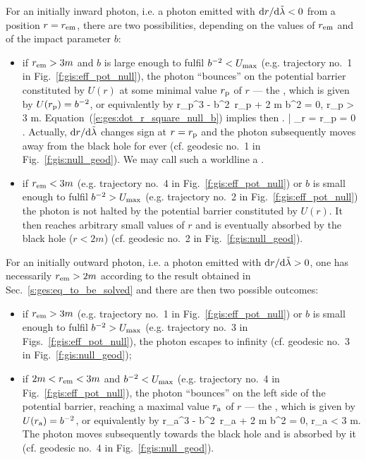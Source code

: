 For an initially inward photon, i.e. a photon emitted with ${\mathrm{d} r}/{\mathrm{d}\tilde{\lambda}} < 0$
from a position $r=r_{\rm em}$, there are
two possibilities, depending on the values of $r_{\rm em}$ and
of the impact parameter $b$:
\begin{itemize}
\item if $r_{\rm em} > 3 m$ and $b$ is large enough to fulfil $b^{-2} < U_{\rm max}$
(e.g. trajectory no.~1 in Fig.~\ref{f:gis:eff_pot_null}), the photon
``bounces'' on the potential barrier constituted by $U(r)$
at some minimal value  $r_{\rm p}$ of $r$ --- the ,
which is given by  $U(r_{\rm p}) = b^{-2}$, or equivalently by
\be \label{e:ges:r_per_null}
  r_{\rm p}^3 - b^2\, r_{\rm p} + 2 m b^2 = 0, \quad r_{\rm p} > 3 m.
\ee
Equation~(\ref{e:ges:dot_r_square_null_b})
implies then
\be
    \left.  \right| _{r = r_{\rm p}} = 0 .
\ee
Actually, $\mathrm{d} r / \mathrm{d}\tilde{\lambda}$ changes sign at $r = r_{\rm p}$ and
the photon subsequently moves away from the black hole for ever (cf. geodesic
no.~1 in Fig.~\ref{f:gis:null_geod}). We may call
such a worldline a .
\item if $r_{\rm em} < 3 m$ (e.g. trajectory
no.~4 in Fig.~\ref{f:gis:eff_pot_null}) or $b$ is small enough to fulfil $b^{-2} > U_{\rm max}$ (e.g. trajectory
no.~2 in Fig.~\ref{f:gis:eff_pot_null}) the photon
is not halted by the potential barrier constituted by $U(r)$. It then reaches arbitrary
small values of $r$ and is eventually absorbed by the black hole ($r < 2m$)
(cf. geodesic no.~2 in Fig.~\ref{f:gis:null_geod}).
\end{itemize}

For an initially outward photon, i.e. a photon emitted with ${\mathrm{d} r}/{\mathrm{d}\tilde{\lambda}} > 0$,
one has necessarily $r_{\rm em}>2m$ according to the result obtained in Sec.~\ref{s:ges:eq_to_be_solved}
and there are then two possible outcomes:

\begin{itemize}
\item if $r_{\rm em} > 3 m$ (e.g. trajectory
no.~1 in Fig.~\ref{f:gis:eff_pot_null}) or
$b$ is small enough to fulfil $b^{-2} > U_{\rm max}$ (e.g. trajectory
no.~3 in Figs.~\ref{f:gis:eff_pot_null}), the photon escapes to infinity
(cf. geodesic no.~3 in Fig.~\ref{f:gis:null_geod});
\item if $2m < r_{\rm em} < 3 m$ and $b^{-2} < U_{\rm max}$ (e.g. trajectory
no.~4 in Fig.~\ref{f:gis:eff_pot_null}), the photon ``bounces'' on the left
side of the potential barrier, reaching a maximal value $r_{\rm a}$ of $r$
--- the ,
which is given by  $U(r_{\rm a}) = b^{-2}$, or equivalently by
\be \label{e:ges:r_apo_null}
   r_{\rm a}^3 - b^2\, r_{\rm a} + 2 m b^2 = 0, \quad r_{\rm a} < 3 m.
\ee
The photon moves subsequently towards the black hole and
is absorbed by it (cf. geodesic no.~4 in Fig.~\ref{f:gis:null_geod}).
\end{itemize}


